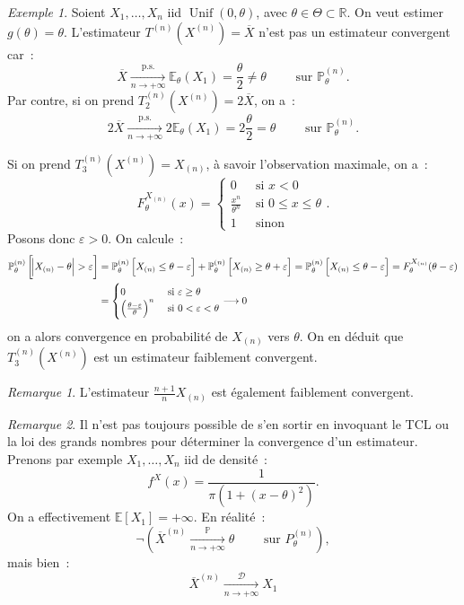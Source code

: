 \documentclass{report}
\DeclareMathOperator{\Unif}{Unif}  %
\renewcommand{\P}{\mathbb P}
\newcommand{\E}{\mathbb E}
\newcommand{\pinfty}{{+\infty}}
\newcommand{\cvgp}{\xrightarrow[n \to \pinfty]{\P}}
\newcommand{\cvgd}{\xrightarrow[n \to \pinfty]{\mathcal D}}
\newcommand{\cvgps}{\xrightarrow[n \to \pinfty]{\text{p.s.}}}
\newcommand{\R}{\mathbb R}
\theoremstyle{definition}
\theoremstyle{remark}
\newtheorem*{rmq}{Remarque}
\newtheorem{ex}{Exemple}[chapter]
\begin{document}
			\begin{ex} Soient $X_1, \ldots, X_n$ iid $\Unif(0, \theta)$, avec $\theta \in \Theta \subset \R$. On veut estimer $g(\theta) = \theta$. L'estimateur
			$T^{(n)}(X^{(n)}) = \overline X$ n'est pas un estimateur convergent car~:
			\[\overline X \cvgps \E_\theta(X_1) = \frac \theta2 \neq \theta \qquad \text{ sur }\P_\theta^{(n)}.\]
			Par contre, si on prend $T_2^{(n)}(X^{(n)}) = 2\overline X$, on a~:
			\[2\overline X \cvgps 2\E_\theta(X_1) = 2\frac \theta2 = \theta \qquad \text{ sur }\P_\theta^{(n)}.\]
			
			Si on prend $T_3^{(n)}(X^{(n)}) = X_{(n)}$, à savoir l'observation maximale, on a~:
			\[F_\theta^{X_{(n)}}(x) = \begin{cases}0 &\text{ si }x < 0 \\\frac {x^n}{\theta^n} &\text{ si } 0 \leq x \leq \theta \\1 &\text{ sinon}\end{cases}.\]
			Posons donc $\varepsilon > 0$. On calcule~:
			\begin{align*}
				\P_\theta^{(n)}\left[\abs {X_{(n)} - \theta} > \varepsilon\right] &= \P_\theta^{(n)}\left[X_{(n)} \leq \theta - \varepsilon\right] 
					+ \P_\theta^{(n)}\left[X_{(n)} \geq \theta + \varepsilon\right] = \P_\theta^{(n)}\left[X_{(n)} \leq \theta - \varepsilon\right]
					= F_\theta^{X_{(n)}}(\theta - \varepsilon) \\
				&=\begin{cases}0 &\text{ si }\varepsilon \geq \theta \\ \left(\frac {\theta-\varepsilon}{\theta}\right)^n &\text{ si } 0 < \varepsilon < \theta\end{cases}
					\longrightarrow 0
			\end{align*}
			on a alors convergence en probabilité de $X_{(n)}$ vers $\theta$. On en déduit que $T_3^{(n)}(X^{(n)})$ est un estimateur faiblement convergent.
			\end{ex}
			
			\begin{rmq} L'estimateur $\frac {n+1}nX_{(n)}$ est également faiblement convergent.
			\end{rmq}
			
			\begin{rmq} Il n'est pas toujours possible de s'en sortir en invoquant le TCL ou la loi des grands nombres pour déterminer la convergence d'un estimateur.
			Prenons par exemple $X_1, \ldots, X_n$ iid de densité~:
			\[f^X(x) = \frac 1{\pi(1 + (x-\theta)^2)}.\]
			On a effectivement $\E[X_1] = \pinfty$. En réalité~:
			\[\lnot\left(\overline X^{(n)} \cvgp \theta \qquad \text{ sur } P_\theta^{(n)}\right),\]
			mais bien~:
			\[\overline X^{(n)} \cvgd X_1\]
			\end{rmq}
	
\end{document}
